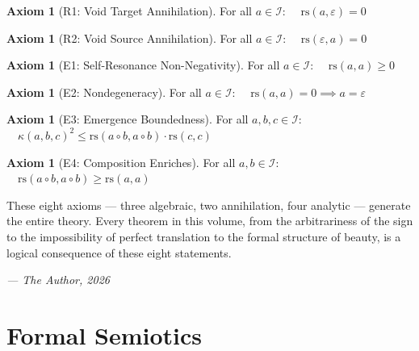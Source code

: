 \documentclass[11pt,oneside]{book}
\theoremstyle{plain}
\theoremstyle{definition}
\newtheorem{axiom_def}[theorem]{Axiom}
\theoremstyle{remark}
\newcommand{\rs}{\mathrm{rs}}
\newcommand{\emerge}{\kappa}
\newcommand{\compose}{\circ}
\newcommand{\void}{\varepsilon}
\newcommand{\IS}{\mathcal{I}}
\begin{document}
\begin{axiom_def}[R1: Void Target Annihilation]
For all $a \in \IS$: $\quad \rs(a, \void) = 0$
\end{axiom_def}

\begin{axiom_def}[R2: Void Source Annihilation]
For all $a \in \IS$: $\quad \rs(\void, a) = 0$
\end{axiom_def}

\begin{axiom_def}[E1: Self-Resonance Non-Negativity]
For all $a \in \IS$: $\quad \rs(a, a) \geq 0$
\end{axiom_def}

\begin{axiom_def}[E2: Nondegeneracy]
For all $a \in \IS$: $\quad \rs(a, a) = 0 \implies a = \void$
\end{axiom_def}

\begin{axiom_def}[E3: Emergence Boundedness]
For all $a, b, c \in \IS$:
$\quad \emerge(a, b, c)^2 \leq \rs(a \compose b, a \compose b) \cdot \rs(c, c)$
\end{axiom_def}

\begin{axiom_def}[E4: Composition Enriches]
For all $a, b \in \IS$:
$\quad \rs(a \compose b, a \compose b) \geq \rs(a, a)$
\end{axiom_def}

\vspace{1em}

These eight axioms --- three algebraic, two annihilation, four analytic ---
generate the entire theory. Every theorem in this volume, from the arbitrariness
of the sign to the impossibility of perfect translation to the formal structure
of beauty, is a logical consequence of these eight statements.

\vspace{2em}
\hfill \textit{--- The Author, 2026}

\tableofcontents

\mainmatter

\part{Formal Semiotics}
\label{part:semiotics}
\end{document}
